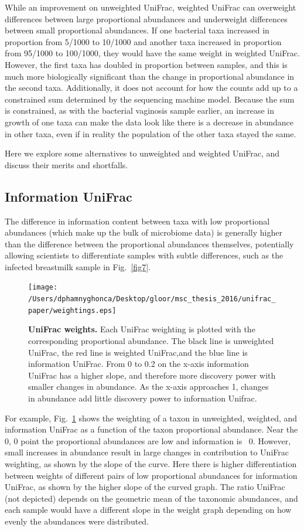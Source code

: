 \documentclass[10pt,letterpaper]{article}
\begin{document}
While an improvement on unweighted UniFrac, weighted UniFrac can overweight differences between large proportional abundances and underweight differences between small proportional abundances. If one bacterial taxa increased in proportion from 5/1000 to 10/1000 and another taxa increased in proportion from 95/1000 to 100/1000, they would have the same weight in weighted UniFrac. However, the first taxa has doubled in proportion between samples, and this is much more biologically significant than the change in proportional abundance in the second taxa. Additionally, it does not account for how the counts add up to a constrained sum determined by the sequencing machine model. Because the sum is constrained, as with the bacterial vaginosis sample earlier, an increase in growth of one taxa can make the data look like there is a decrease in abundance in other taxa, even if in reality the population of the other taxa stayed the same.

Here we explore some alternatives to unweighted and weighted UniFrac, and discuss their merits and shortfalls.

\FloatBarrier

\subsection{Information UniFrac}

The difference in information content between taxa with low proportional abundances (which make up the bulk of microbiome data) is generally higher than the difference between the proportional abundances themselves, potentially allowing scientists to differentiate samples with subtle differences, such as the infected breastmilk sample in Fig.~\ref{fig7}.

\begin{figure}[h]
\texttt{[image: /Users/dphamnyghonca/Desktop/gloor/msc\_thesis\_2016/unifrac\_paper/weightings.eps]}
\caption{{\bf UniFrac weights. }
Each UniFrac weighting is plotted with the corresponding proportional abundance. The black line is unweighted UniFrac, the red line is weighted UniFrac,and  the blue line is information UniFrac. From 0 to 0.2 on the x-axis information UniFrac has a higher slope, and therefore more discovery power with smaller changes in abundance. As the x-axis approaches 1, changes in abundance add little discovery power to information Unifrac.}
\label{fig5}
\end{figure}

For example, Fig.~\ref{fig5} shows the weighting of a taxon in unweighted, weighted, and information UniFrac as a function of the taxon proportional abundance. Near the 0, 0 point the proportional abundances are low and information is ~0. However, small increases in abundance result in large changes in contribution to UniFrac weighting, as shown by the slope of the curve. Here there is higher differentiation between weights of different pairs of low proportional abundances for information UniFrac, as shown by the higher slope of the curved graph. The ratio UniFrac (not depicted) depends on the geometric mean of the taxonomic abundances, and each sample would have a different slope in the weight graph depending on how evenly the abundances were distributed.
\end{document}
